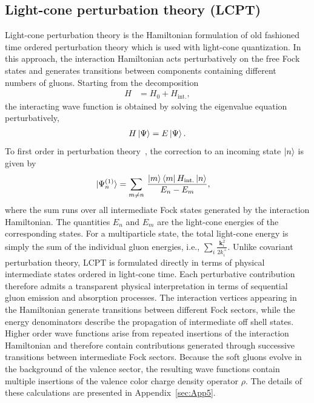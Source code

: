 \documentclass[a4paper,11pt]{article}
\begin{document}
\subsection{Light-cone perturbation theory (LCPT)} \label{sec:LCPT1}
Light-cone perturbation theory is the Hamiltonian formulation of old fashioned time ordered perturbation theory which is used with light-cone quantization. In this approach, the interaction Hamiltonian acts perturbatively on the free Fock states and generates transitions between components containing different numbers of gluons. Starting from the decomposition
\begin{align}
H & = H_{0} + H_{\text{int.}},
\end{align}
the interacting wave function is obtained by solving the eigenvalue equation perturbatively,
\begin{align}
H\ket{\Psi} = E\ket{\Psi}.
\end{align}
To first order in perturbation theory~\cite{Landau:1991wop,shankar2012principles}, the correction to an incoming state $\ket{n}$ is given by
\begin{align}
\ket{\Psi^{(1)}_{n}} & =  \sum_{m\neq n}\,\frac{\ket{m}\bra{m}H_\text{int.}\ket{n}}{E_{n}-E_{m}},
\end{align}
where the sum runs over all intermediate Fock states generated by the interaction Hamiltonian. The quantities $E_{n}$ and $E_{m}$ are the light-cone energies of the corresponding states. For a multiparticle state, the total light-cone energy is simply the sum of the individual gluon energies, i.e., $\sum_{i}\frac{\mathbf{k}_{i}^{2}}{2k_{i}^{+}}$. Unlike covariant perturbation theory, LCPT is formulated directly in terms of physical intermediate states ordered in light-cone time. Each perturbative contribution therefore admits a transparent physical interpretation in terms of sequential gluon emission and absorption processes. The interaction vertices appearing in the Hamiltonian generate transitions between different Fock sectors, while the energy denominators describe the propagation of intermediate off shell states. Higher order wave functions arise from repeated insertions of the interaction Hamiltonian and therefore contain contributions generated through successive transitions between intermediate Fock sectors. Because the soft gluons evolve in the background of the valence sector, the resulting wave functions contain multiple insertions of the valence color charge density operator $\rho$. The details of these calculations are presented in Appendix~\ref{sec:App5}. 
\end{document}
